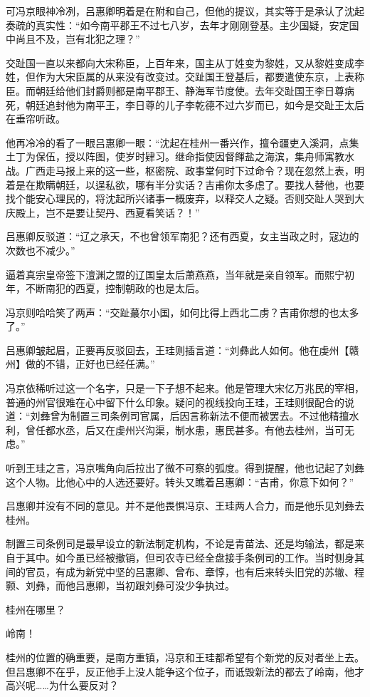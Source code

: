 可冯京眼神冷冽，吕惠卿明着是在附和自己，但他的提议，其实等于是承认了沈起奏疏的真实性：“如今南平郡王不过七八岁，去年才刚刚登基。主少国疑，安定国中尚且不及，岂有北犯之理？”

交趾国一直以来都向大宋称臣，上百年来，国主从丁姓变为黎姓，又从黎姓变成李姓，但作为大宋臣属的从来没有改变过。交趾国王登基后，都要遣使东京，上表称臣。而朝廷给他们封爵则都是南平郡王、静海军节度使。去年交趾国王李日尊病死，朝廷追封他为南平王，李日尊的儿子李乾德不过六岁而已，如今是交趾王太后在垂帘听政。

他再冷冷的看了一眼吕惠卿一眼：“沈起在桂州一番兴作，擅令疆吏入溪洞，点集土丁为保伍，授以阵图，使岁时肄习。继命指使因督餫盐之海滨，集舟师寓教水战。广西走马报上来的这一些，枢密院、政事堂何时下过命令？现在忽然上表，明着是在欺瞒朝廷，以逞私欲，哪有半分实话？吉甫你太多虑了。要找人替他，也要找个能安心理民的，将沈起所兴诸事一概废弃，以释交人之疑。否则交趾人哭到大庆殿上，岂不是要让契丹、西夏看笑话？！”

吕惠卿反驳道：“辽之承天，不也曾领军南犯？还有西夏，女主当政之时，寇边的次数也不减少。”

逼着真宗皇帝签下澶渊之盟的辽国皇太后萧燕燕，当年就是亲自领军。而熙宁初年，不断南犯的西夏，控制朝政的也是太后。

冯京则哈哈笑了两声：“交趾蕞尔小国，如何比得上西北二虏？吉甫你想的也太多了。”

吕惠卿皱起眉，正要再反驳回去，王珪则插言道：“刘彝此人如何。他在虔州【赣州】做的不错，正好也已经任满。”

冯京依稀听过这一个名字，只是一下子想不起来。他是管理大宋亿万兆民的宰相，普通的州官很难在心中留下什么印象。疑问的视线投向王珪，王珪则很配合的说道：“刘彝曾为制置三司条例司官属，后因言称新法不便而被罢去。不过他精擅水利，曾任都水丞，后又在虔州兴沟渠，制水患，惠民甚多。有他去桂州，当可无虑。”

听到王珪之言，冯京嘴角向后拉出了微不可察的弧度。得到提醒，他也记起了刘彝这个人物。比他心中的人选还要好。转头又瞧着吕惠卿：“吉甫，你意下如何？”

吕惠卿并没有不同的意见。并不是他畏惧冯京、王珪两人合力，而是他乐见刘彝去桂州。

制置三司条例司是最早设立的新法制定机构，不论是青苗法、还是均输法，都是来自于其中。如今虽已经被撤销，但司农寺已经全盘接手条例司的工作。当时侧身其间的官员，有成为新党中坚的吕惠卿、曾布、章惇，也有后来转头旧党的苏辙、程颢、刘彝，而他吕惠卿，当初跟刘彝可没少争执过。

桂州在哪里？

岭南！

桂州的位置的确重要，是南方重镇，冯京和王珪都希望有个新党的反对者坐上去。但吕惠卿不在乎，反正他手上没人能争这个位子，而诋毁新法的都去了岭南，他才高兴呢……为什么要反对？

